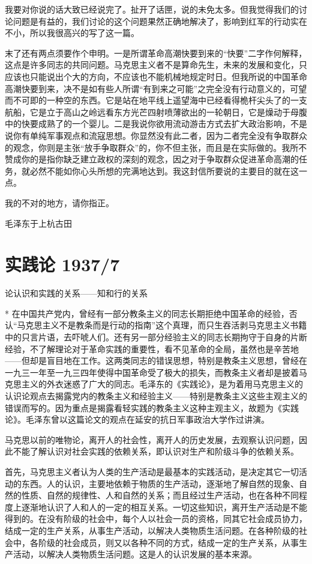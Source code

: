 \documentclass[UTF8, 12pt, a4paper]{ctexrep}
\begin{document}
我要对你说的话大致已经说完了。扯开了话匣，说的未免太多。但我觉得我们的讨论问题是有益的，我们讨论的这个问题果然正确地解决了，影响到红军的行动实在不小，所以我很高兴的写了这一篇。

末了还有两点须要作个申明。一是所谓革命高潮快要到来的“快要”二字作何解释，这点是许多同志的共同问题。马克思主义者不是算命先生，未来的发展和变化，只应该也只能说出个大的方向，不应该也不能机械地规定时日。但我所说的中国革命高潮快要到来，决不是如有些人所谓“有到来之可能”之完全没有行动意义的，可望而不可即的一种空的东西。它是站在地平线上遥望海中已经看得桅杆尖头了的一支航船，它是立于高山之岭远看东方光芒四射喷薄欲出的一轮朝日，它是燥动于母腹中的快要成熟了的一个婴儿。二是我说你欲用流动游击方式去扩大政治影响，不是说你有单纯军事观点和流寇思想。你显然没有此二者，因为二者完全没有争取群众的观念，你则是主张“放手争取群众”的，你不但主张，而且是在实际做的。我所不赞成你的是指你缺乏建立政权的深刻的观念，因之对于争取群众促进革命高潮的任务，就必然不能如你心头所想的完满地达到。我这封信所要说的主要目的就在这一点。

我的不对的地方，请你指正。

毛泽东于上杭古田

\section{实践论 1937/7}

论认识和实践的关系——知和行的关系

* 在中国共产党内，曾经有一部分教条主义的同志长期拒绝中国革命的经验，否认“马克思主义不是教条而是行动的指南”这个真理，而只生吞活剥马克思主义书籍中的只言片语，去吓唬人们。还有另一部分经验主义的同志长期拘守于自身的片断经验，不了解理论对于革命实践的重要性，看不见革命的全局，虽然也是辛苦地——但却是盲目地在工作。这两类同志的错误思想，特别是教条主义思想，曾经在一九三一年至一九三四年使得中国革命受了极大的损失，而教条主义者却是披着马克思主义的外衣迷惑了广大的同志。毛泽东的《实践论》，是为着用马克思主义的认识论观点去揭露党内的教条主义和经验主义——特别是教条主义这些主观主义的错误而写的。因为重点是揭露看轻实践的教条主义这种主观主义，故题为《实践论》。毛泽东曾以这篇论文的观点在延安的抗日军事政治大学作过讲演。

马克思以前的唯物论，离开人的社会性，离开人的历史发展，去观察认识问题，因此不能了解认识对社会实践的依赖关系，即认识对生产和阶级斗争的依赖关系。

首先，马克思主义者认为人类的生产活动是最基本的实践活动，是决定其它一切活动的东西。人的认识，主要地依赖于物质的生产活动，逐渐地了解自然的现象、自然的性质、自然的规律性、人和自然的关系；而且经过生产活动，也在各种不同程度上逐渐地认识了人和人的一定的相互关系。一切这些知识，离开生产活动是不能得到的。在没有阶级的社会中，每个人以社会一员的资格，同其它社会成员协力，结成一定的生产关系，从事生产活动，以解决人类物质生活问题。在各种阶级的社会中，各阶级的社会成员，则又以各种不同的方式，结成一定的生产关系，从事生产活动，以解决人类物质生活问题。这是人的认识发展的基本来源。
\end{document}
